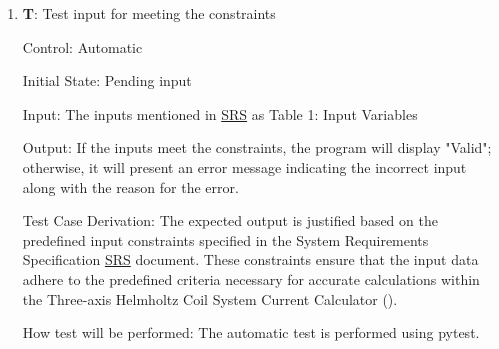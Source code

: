\documentclass[12pt, titlepage]{article}
\newcounter{testCase}
\newcommand{\testCaseFormat}{T\thetestCase}
\begin{document}
\begin{enumerate}

\item{\textbf{\testCaseFormat \label{T_input1}}: Test input for meeting the constraints}


Control: Automatic
					
Initial State: Pending input
					
Input: The inputs mentioned in \href{https://github.com/rnorouziani/Helmholtz-Coil-Current-Calculator-CAS741/blob/main/docs/SRS/SRS.pdf}{SRS} as Table 1: Input Variables
					
Output: If the inputs meet the constraints, the program will display "Valid"; otherwise, it will present an error message indicating the incorrect input along with the reason for the error.

Test Case Derivation: The expected output is justified based on the predefined input constraints specified in the System Requirements Specification \href{https://github.com/rnorouziani/Helmholtz-Coil-Current-Calculator-CAS741/blob/main/docs/SRS/SRS.pdf}{SRS} document. These constraints ensure that the input data adhere to the predefined criteria necessary for accurate calculations within the Three-axis Helmholtz Coil System Current Calculator (\progname{}).	
			
How test will be performed: The automatic test is performed using pytest.
					
\end{enumerate}
\end{document}
